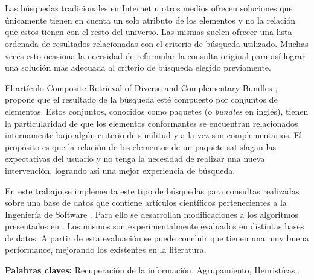\chapter*{\runtitulo}

\noindent Las búsquedas tradicionales en Internet u otros medios ofrecen soluciones que únicamente tienen en cuenta un solo atributo de los elementos y no la relación que estos tienen con el resto del universo. Las mismas suelen ofrecer una lista ordenada de resultados relacionadas con el criterio de búsqueda utilizado. Muchas veces esto ocasiona la necesidad de reformular la consulta original para así lograr una solución más adecuada al criterio de búsqueda elegido previamente.

El artículo Composite Retrieval of Diverse and Complementary Bundles \cite{compositeRetrival}, propone que el resultado de la búsqueda esté compuesto por conjuntos de elementos. Estos conjuntos, conocidos como paquetes (o \textit{bundles} en inglés), tienen la particularidad de que los elementos conformantes se encuentran relacionados internamente bajo algún criterio de similitud y a la vez son complementarios. El propósito es que la relación de los elementos de un paquete satisfagan las expectativas del usuario y no tenga la necesidad de realizar una nueva intervención, logrando así una mejor experiencia de búsqueda.

En este trabajo se implementa este tipo de búsquedas para consultas realizadas sobre una base de datos que contiene artículos científicos pertenecientes a la Ingeniería de Software \cite{dataDrive}. Para ello se desarrollan modificaciones a los algoritmos presentados en \cite{compositeRetrival}. Los mismos son experimentalmente evaluados en distintas bases de datos. A partir de
esta evaluación se puede concluir que tienen una muy buena performance, mejorando los existentes en la literatura.

\bigskip


\noindent\textbf{Palabras claves:} Recuperación de la información, Agrupamiento, Heuristícas.